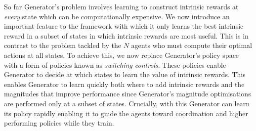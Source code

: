 \documentclass{article}
\begin{document}
So far {\selectfont Generator}'s problem involves learning to construct intrinsic rewards at \textit{every} state which can be computationally expensive. We now introduce an important feature to the framework with which it only learns the best intrinsic reward in a subset of states in which intrinsic rewards are most useful. This is in contrast to the problem tackled by the $N$ agents who must compute their optimal actions at all states. 
% 
% 
% 
% 
% 
% 
% 
% 
% 
% 
% 
% 
 To achieve this, we now replace {\selectfont Generator}'s policy space with a form of policies known as \textit{switching controls}. These policies enable {\selectfont Generator} to decide at which states to learn the value of intrinsic rewards. This enables {\selectfont Generator} to learn quickly both where to add intrinsic rewards and the magnitudes that improve performance since {\selectfont Generator}'s magnitude optimisations are performed only at a subset of states. Crucially, with this {\selectfont Generator} can learn its policy rapidly enabling it to guide the agents toward coordination and higher performing policies while they train.  
\end{document}
